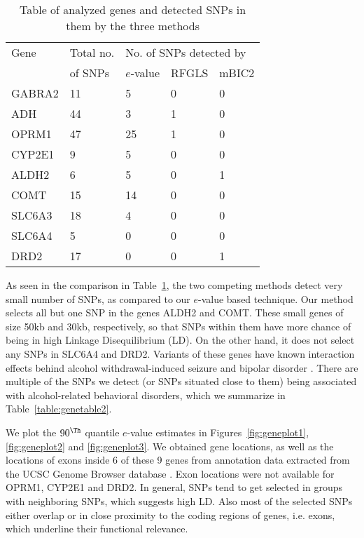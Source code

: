 \begin{table}
    \begin{tabular}{l|l|lll}
    \hline
    Gene   & Total no. & \multicolumn{3}{l}{No. of SNPs detected by }\\\cline{3-5}
    & of SNPs & $e$-value & RFGLS & mBIC2 \\\hline
    GABRA2 & 11        & 5       & 0     & 0     \\
    ADH    & 44        & 3       & 1     & 0     \\
    OPRM1  & 47        & 25      & 1     & 0     \\
    CYP2E1 & 9         & 5       & 0     & 0     \\
    ALDH2  & 6         & 5       & 0     & 1     \\
    COMT   & 15        & 14      & 0     & 0     \\
    SLC6A3 & 18        & 4       & 0     & 0     \\
    SLC6A4 & 5         & 0       & 0     & 0     \\
    DRD2   & 17        & 0       & 0     & 1     \\\hline
    \end{tabular}
    \caption{Table of analyzed genes and detected SNPs in them by the three methods}
    \label{table:genetable}
\end{table}

As seen in the comparison in Table~\ref{table:genetable}, the two competing methods detect very small number of SNPs, as compared to our $e$-value based technique. Our method selects all but one SNP in the genes ALDH2 and COMT. These small genes of size 50kb and 30kb, respectively, so that SNPs within them have more chance of being in high Linkage Disequilibrium (LD). On the other hand, it does not select any SNPs in SLC6A4 and DRD2. Variants of these genes have known interaction effects behind alcohol withdrawal-induced seizure \citep{KarpyakEtal10} and bipolar disorder \citep{WangEtal14}. There are multiple of the SNPs we detect (or SNPs situated close to them) being associated with alcohol-related behavioral disorders, which we summarize in Table~\ref{table:genetable2}.

We plot the $90^{\Th}$ quantile $e$-value estimates in Figures~\ref{fig:geneplot1}, \ref{fig:geneplot2} and \ref{fig:geneplot3}. We obtained gene locations, as well as the locations of exons inside 6 of these 9 genes from annotation data extracted from the UCSC Genome Browser database \citep{UCSCdata}. Exon locations were not available for OPRM1, CYP2E1 and DRD2. In general, SNPs tend to get selected in groups with neighboring SNPs, which suggests high LD. Also most of the selected SNPs either overlap or in close proximity to the coding regions of genes, i.e. exons, which underline their functional relevance.

